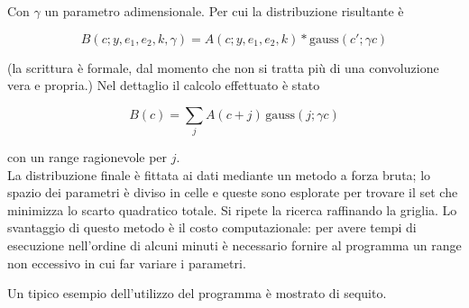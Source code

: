 \documentclass[a4paper,11pt,italian]{report}
\begin{document}
Con $\gamma$ un parametro adimensionale. Per cui la distribuzione risultante è

\[ B(c; y, e_1, e_2, k ,\gamma) = A(c;y,e_1,e_2,k) * \text{gauss}(c';\gamma c) \]

(la scrittura è formale, dal momento che non si tratta più di una convoluzione vera e propria.) Nel dettaglio il calcolo effettuato è stato

\[ B(c) = \sum_j A(c+j)\,  \text{gauss}(j;\gamma c) \]

con un range ragionevole per $j$.\\

La distribuzione finale è fittata ai dati mediante un metodo a forza bruta; lo spazio dei parametri è diviso in celle e queste sono esplorate per trovare il set che minimizza lo scarto quadratico totale. Si ripete la ricerca raffinando la griglia. Lo svantaggio di questo metodo è il costo computazionale: per avere tempi di esecuzione nell'ordine di alcuni minuti è necessario fornire al programma un range non eccessivo in cui far variare i parametri. 

Un tipico esempio dell'utilizzo del programma è mostrato di sequito.
\end{document}
